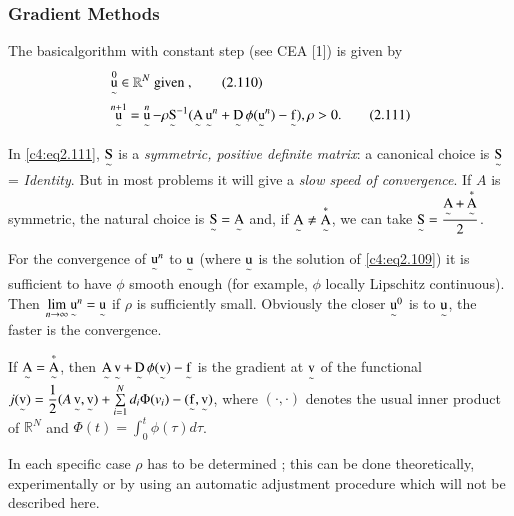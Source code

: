 \subsubsection{Gradient Methods}\label{c4:sss2.6.3} 

The basic\pageoriginale  algorithm with constant step (see CEA [1]) is given by
\begin{align}
& \operatorname*{u}\limits_\sim ^{0} \in \mathbb{R}^N \text{ given },
  \tag{2.110}\label{c4:eq2.110}\\ 
& \operatorname*{u}\limits_\sim^{n+1} = \operatorname*{u}\limits_\sim^n- \rho {\operatorname*{S}\limits_\sim}^{-1}
  (\operatorname*{A}\limits_\sim {\operatorname*{u}\limits_\sim}^n + \operatorname*{D}\limits_\sim \phi
  ({\operatorname*{u}\limits_\sim}^n) - \operatorname*{f}\limits_\sim ), \rho >
  0. \tag{2.111}\label{c4:eq2.111} 
\end{align}

In \eqref{c4:eq2.111}, $\operatorname*{S}\limits_\sim$ is a \textit{symmetric,
  positive definite matrix}: a canonical choice is $\operatorname*{S}\limits_\sim$ =
\textit{Identity}. But in most problems it will give a \textit{slow
  speed of convergence}. If $A$ is symmetric, the natural choice is
$\operatorname*{S}\limits_\sim = \operatorname*{A}\limits_\sim$ and, if $\operatorname*{A}\limits_\sim \neq
\operatorname*{A}\limits_\sim^*$, we can take $\operatorname*{S}\limits_\sim =
\dfrac{\operatorname*{A}\limits_\sim+ \operatorname*{A}\limits_\sim^*}{2}$. 

For the convergence of ${\operatorname*{u}\limits_\sim}^n$ to $\operatorname*{u}\limits_\sim$ (where
$\operatorname*{u}\limits_\sim$ is the solution of \eqref{c4:eq2.109}) it is
sufficient to have $\phi$ smooth enough (for example, $\phi$ locally
Lipschitz continuous). Then $\lim\limits_{n \to \infty}
{\operatorname*{u}\limits_\sim}^n = \operatorname*{u}\limits_\sim$ if $\rho$ is sufficiently
small. Obviously the closer ${\operatorname*{u}\limits_\sim}^0$ is to
$\operatorname*{u}\limits_\sim$, the faster is the convergence. 

\begin{remark}\label{c4:rem2.6}%
If $\operatorname*{A}\limits_\sim = \operatorname*{A} \limits_\sim ^*$, then $\operatorname*{A}\limits_\sim \operatorname*{v}
\limits_\sim  +\operatorname*{D} \limits_\sim \phi (\operatorname*{v}\limits_\sim)-\operatorname*{f} \limits_\sim$
is the gradient at $\operatorname*{v}\limits_\sim$ of the functional
$j(\operatorname*{v}\limits_\sim) = \dfrac{1}{2} (A \operatorname*{v}\limits_\sim, \operatorname*{v}\limits_\sim) +
\sum \limits^{N}_{i=1} d_i \Phi (v_i) -(\operatorname*{f}\limits_\sim,
\operatorname*{v}\limits_\sim)$, where $(\cdot, \cdot)$ denotes the usual inner
product of $\mathbb{R}^N$ and $\Phi(t) = \int^t_0 \phi (\tau)d \tau$. 
\end{remark}

\begin{remark}\label{c4:rem2.7}%
In each specific case $\rho$ has to be determined ; this can be done theoretically, experimentally or by using an automatic adjustment procedure which will not be described here.
\end{remark}

